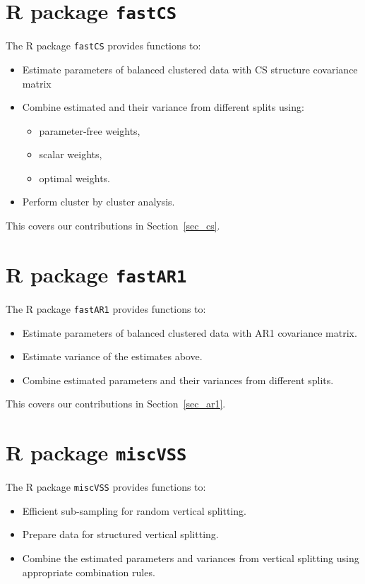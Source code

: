 \documentclass[11pt,a5paper,twoside]{book}
\begin{document}
\section{R package {\tt{fastCS}}}

The R package {\tt{fastCS}} provides functions to:

\begin{itemize}
\item Estimate parameters of balanced clustered data with CS structure covariance matrix 
\item Combine estimated and their variance from different splits using:
\vspace{-\topsep}
\begin{itemize}
\item parameter-free weights,
\item scalar weights,
\item optimal weights.
\end{itemize}
\vspace{-\topsep}
\item Perform cluster by cluster analysis.
\end{itemize}

This covers our contributions in Section~\ref{sec_cs}.

\section{R package {\tt{fastAR1}}}

The R package {\tt{fastAR1}} provides functions to:

\begin{itemize}
\item Estimate parameters of balanced clustered data with AR1 covariance matrix.
\item Estimate variance of the estimates above.
\item Combine estimated parameters and their variances from different splits.
\end{itemize}

This covers our contributions in Section~\ref{sec_ar1}.


\section{R package {\tt{miscVSS}}}
\label{sec_miscVSS}
The R package {\tt{miscVSS}} provides functions to:

\begin{itemize}
\item Efficient sub-sampling for random vertical splitting.
\item Prepare data for structured vertical splitting.
\item Combine the estimated parameters and variances from vertical splitting using appropriate combination rules.
\end{itemize}
\end{document}
